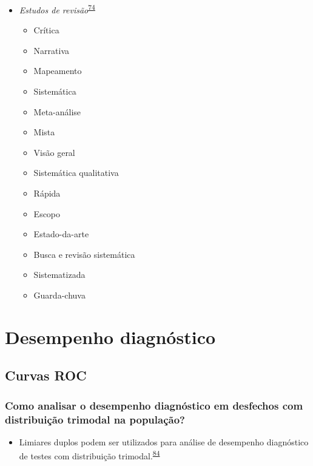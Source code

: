 \documentclass[
]{book}
\providecommand{\tightlist}{%
  \setlength{\itemsep}{0pt}\setlength{\parskip}{0pt}}
\begin{document}
\begin{itemize}
\tightlist
\item
  \emph{Estudos de revisão}\textsuperscript{\protect\hyperlink{ref-Grant2009}{74}}

  \begin{itemize}
  \tightlist
  \item
    Crítica
  \item
    Narrativa
  \item
    Mapeamento
  \item
    Sistemática
  \item
    Meta-análise
  \item
    Mista
  \item
    Visão geral
  \item
    Sistemática qualitativa
  \item
    Rápida
  \item
    Escopo
  \item
    Estado-da-arte
  \item
    Busca e revisão sistemática
  \item
    Sistematizada
  \item
    Guarda-chuva
  \end{itemize}
\end{itemize}

\hypertarget{desempenho-diagnostico}{%
\chapter{\texorpdfstring{\textbf{Desempenho diagnóstico}}{Desempenho diagnóstico}}\label{desempenho-diagnostico}}

\hypertarget{curvas-roc}{%
\section{Curvas ROC}\label{curvas-roc}}

\hypertarget{como-analisar-o-desempenho-diagnuxf3stico-em-desfechos-com-distribuiuxe7uxe3o-trimodal-na-populauxe7uxe3o}{%
\subsection{Como analisar o desempenho diagnóstico em desfechos com distribuição trimodal na população?}\label{como-analisar-o-desempenho-diagnuxf3stico-em-desfechos-com-distribuiuxe7uxe3o-trimodal-na-populauxe7uxe3o}}

\begin{itemize}
\tightlist
\item
  Limiares duplos podem ser utilizados para análise de desempenho diagnóstico de testes com distribuição trimodal.\textsuperscript{\protect\hyperlink{ref-ferreira2021}{84}}
\end{itemize}
\end{document}
